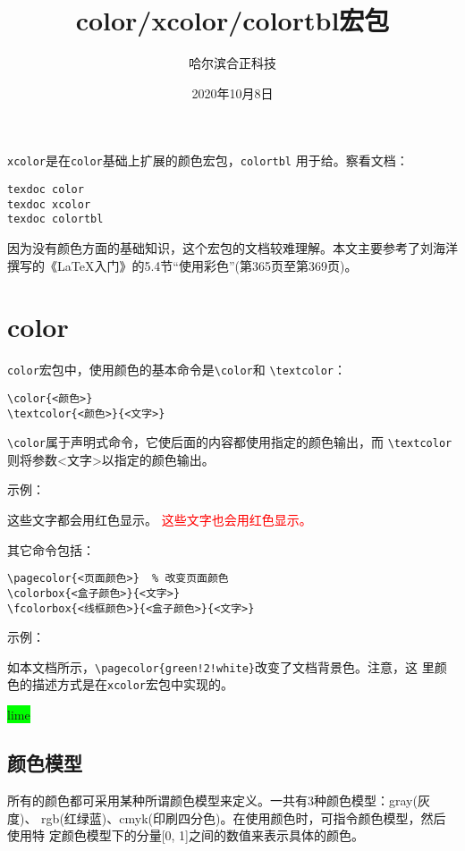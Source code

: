 \documentclass{article}
\title{color/xcolor/colortbl宏包}
\author{哈尔滨合正科技}
\date{2020年10月8日}
\begin{document}
\maketitle

\pagecolor{green!1!white}

\texttt{xcolor}是在\texttt{color}基础上扩展的颜色宏包，\texttt{colortbl}
用于给。察看文档：

\begin{verbatim}
texdoc color
texdoc xcolor
texdoc colortbl
\end{verbatim}

因为没有颜色方面的基础知识，这个宏包的文档较难理解。本文主要参考了刘海洋
撰写的《\LaTeX{}入门》的5.4节“使用彩色”(第365页至第369页)。

\section{color}

\texttt{color}宏包中，使用颜色的基本命令是\verb!\color!和
\verb!\textcolor!：

\begin{verbatim}
\color{<颜色>}
\textcolor{<颜色>}{<文字>}
\end{verbatim}

\verb!\color!属于声明式命令，它使后面的内容都使用指定的颜色输出，而
\verb!\textcolor!则将参数<文字>以指定的颜色输出。

示例：

{\color{red} 这些文字都会用红色显示。}
\textcolor{red}{这些文字也会用红色显示。}

其它命令包括：

\begin{verbatim}
\pagecolor{<页面颜色>}  % 改变页面颜色
\colorbox{<盒子颜色>}{<文字>} 
\fcolorbox{<线框颜色>}{<盒子颜色>}{<文字>}
\end{verbatim}

示例：

如本文档所示，\verb|\pagecolor{green!2!white}|改变了文档背景色。注意，这
里颜色的描述方式是在\texttt{xcolor}宏包中实现的。

\colorbox{lime}{lime}


\subsection{颜色模型}

所有的颜色都可采用某种所谓颜色模型来定义。一共有3种颜色模型：gray(灰度)、
rgb(红绿蓝)、cmyk(印刷四分色)。在使用颜色时，可指令颜色模型，然后使用特
定颜色模型下的分量[0, 1]之间的数值来表示具体的颜色。
\end{document}
